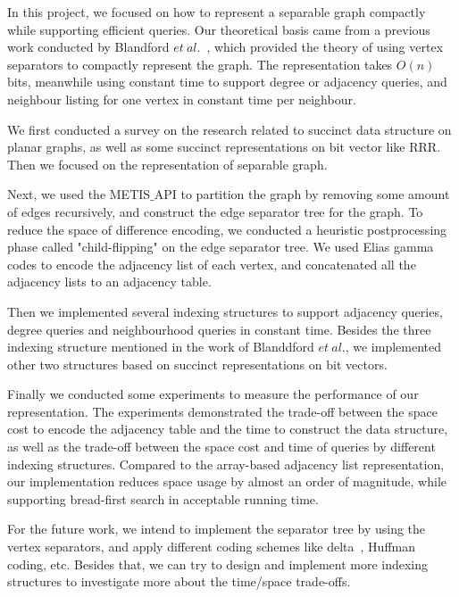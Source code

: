 \documentclass[12pt,glossary]{dalthesis}
\begin{document}
In this project, we focused on how to represent a separable graph compactly while supporting efficient queries. Our theoretical basis came from a previous work conducted by Blandford $et \ al.$~\cite{compact-representation}, which provided the theory of using vertex separators to compactly represent the graph. The representation takes $O(n)$ bits, meanwhile using constant time to support degree or adjacency queries, and neighbour listing for one vertex in constant time per neighbour. 

\bigskip
\bigskip

We first conducted a survey on the research related to succinct data structure on planar graphs, as well as some succinct representations on bit vector like RRR. Then we focused on the representation of separable graph. 

\bigskip
\bigskip

Next, we used the METIS$\_$API to partition the graph by removing some amount of edges recursively, and construct the edge separator tree for the graph. To reduce the space of difference encoding, we conducted a heuristic postprocessing phase called "child-flipping" on the edge separator tree. We used Elias gamma codes to encode the adjacency list of each vertex, and concatenated all the adjacency lists to an adjacency table.

\bigskip
\bigskip

Then we implemented several indexing structures to support adjacency queries, degree queries and neighbourhood queries in constant time. Besides the three indexing structure mentioned in the work of Blanddford $et \ al.$, we implemented other two structures based on succinct representations on bit vectors.

\bigskip
\bigskip

Finally we conducted some experiments to measure the performance of our representation. The experiments demonstrated the trade-off between the space cost to encode the adjacency table and the time to construct the data structure, as well as the trade-off between the space cost and time of queries by different indexing structures. Compared to the array-based adjacency list representation, our implementation reduces space usage by almost an order of magnitude, while supporting bread-first search in acceptable running time.

\bigskip
\bigskip

For the future work, we intend to implement the separator tree by using the vertex separators, and apply different coding schemes like delta~\cite{Elias}, Huffman coding, etc. Besides that, we can try to design and implement more indexing structures to investigate more about the time/space trade-offs.
 


\end{document}
